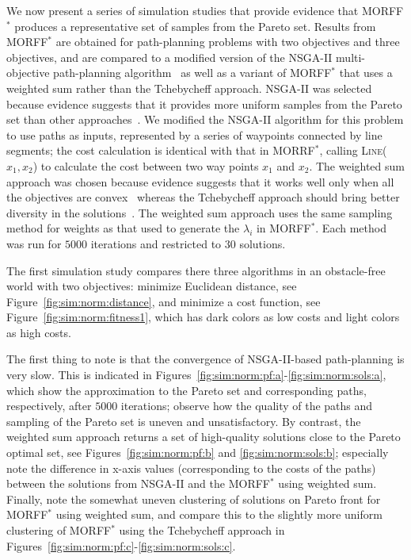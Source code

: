 \documentclass{article}
\begin{document}
We now present a series of simulation studies that provide evidence that MORFF$^{*}$ produces a representative set of samples from the Pareto set.
Results from MORFF$^{*}$ are obtained for path-planning problems with two objectives and three objectives, and are compared to a modified version of the NSGA-II multi-objective path-planning algorithm~\cite{Ahmed2013} as well as a variant of MORFF$^{*}$ that uses a weighted sum rather than the Tchebycheff approach.
NSGA-II was selected because evidence suggests that it provides more uniform samples from the Pareto set than other approaches~\cite{deb2002fast}.  
We modified the NSGA-II algorithm for this problem to use paths as inputs, represented by a series of waypoints connected by line segments; the cost calculation is identical with that in  MORRF$^{*}$, calling \textsc{Line}($ x_{1}, x_{2} $) to calculate the cost between two way points $ x_{1} $ and $ x_{2} $.  
The weighted sum approach was chosen because evidence suggests that it works well only when all the objectives are convex~\cite{4358754} whereas the Tchebycheff approach should bring better diversity in the solutions~\cite{4358754}.  
The weighted sum approach uses the same sampling method for weights as that used to generate the $\lambda_i$ in MORFF$^{*}$.
Each method was run for $ 5000 $ iterations and restricted to $ 30 $ solutions.  

The first simulation study compares there three algorithms in an obstacle-free world with two objectives: 
minimize Euclidean distance, see Figure~\ref{fig:sim:norm:distance}, and minimize a cost function, see Figure~\ref{fig:sim:norm:fitness1}, which has dark colors as low costs and light colors as high costs.  


The first thing to note is that the convergence of NSGA-II-based path-planning is very slow.
This is indicated in Figures~\ref{fig:sim:norm:pf:a}-\ref{fig:sim:norm:sols:a}, which show the approximation to the Pareto set and corresponding paths, respectively, after $5000$ iterations; observe how the quality of the paths and sampling of the Pareto set is uneven and unsatisfactory.
By contrast, the weighted sum approach returns a set of high-quality solutions close to the Pareto optimal set, see Figures~\ref{fig:sim:norm:pf:b} and \ref{fig:sim:norm:sols:b}; especially note the difference in x-axis values (corresponding to the costs of the paths) between the solutions from NSGA-II and the MORFF$^{*}$ using weighted sum.
Finally, note the somewhat uneven clustering of solutions on Pareto front for MORFF$^{*}$ using weighted sum, and compare this to the slightly more uniform clustering of MORFF$^{*}$ using the Tchebycheff approach in Figures~\ref{fig:sim:norm:pf:c}-\ref{fig:sim:norm:sols:c}.
\end{document}
